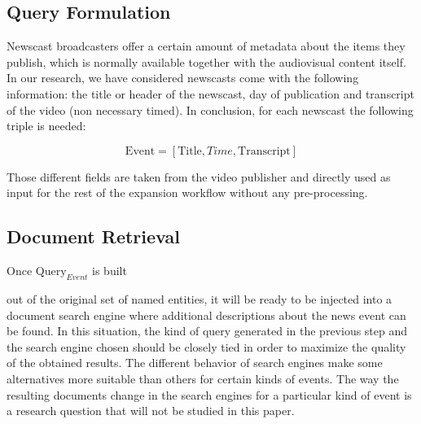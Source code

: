\documentclass{llncs}
\begin{document}
\subsection{Query Formulation}


Newscast broadcasters offer a certain amount of metadata about the items they publish, which is normally available together with the audiovisual content itself. In our research, we have considered newscasts come with the following information: the title or header of the newscast, day of publication and transcript of the video (non necessary timed). In conclusion, for each newscast the following triple is needed:

\begin{equation}
\text{Event} =\left [ \text{Title}, Time, \text{Transcript} \right ]
\end{equation}

Those different fields are taken from the video publisher and directly used as input for the rest of the expansion workflow without any pre-processing.

\subsection{Document Retrieval}

Once $\text{Query}_{Event}$ is built 

out of the original set of named entities, it will be ready to be injected into a document search engine where additional descriptions about the news event can be found. In this situation, the kind of query generated in the previous step and the search engine chosen should be closely tied in order to maximize the quality of the obtained results. The different behavior of search engines make some alternatives more suitable than others for certain kinds of events. The way the resulting documents change in the search engines for a particular kind of event is a research question that will not be studied in this paper.
\end{document}
